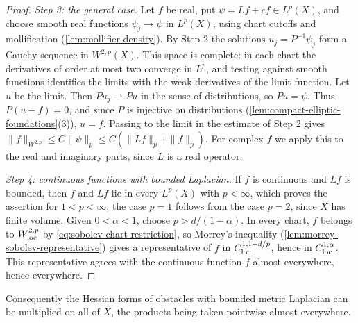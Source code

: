 \begin{proof}
\emph{Step 3: the general case.} Let $f$ be real, put $\psi=Lf+cf\in L^p(X)$, and choose smooth real functions $\psi_j\to\psi$ in $L^p(X)$, using chart cutoffs and mollification (\cref{lem:mollifier-density}). By Step 2 the solutions $u_j=P^{-1}\psi_j$ form a Cauchy sequence in $W^{2,p}(X)$. This space is complete: in each chart the derivatives of order at most two converge in $L^p$, and testing against smooth functions identifies the limits with the weak derivatives of the limit function. Let $u$ be the limit. Then $Pu_j\rightharpoonup Pu$ in the sense of distributions, so $Pu=\psi$. Thus $P(u-f)=0$, and since $P$ is injective on distributions (\cref{lem:compact-elliptic-foundations}(3)), $u=f$. Passing to the limit in the estimate of Step 2 gives $\|f\|_{W^{2,p}}\leq C\|\psi\|_p\leq C(\|Lf\|_p+\|f\|_p)$. For complex $f$ we apply this to the real and imaginary parts, since $L$ is a real operator.

\emph{Step 4: continuous functions with bounded Laplacian.} If $f$ is continuous and $Lf$ is bounded, then $f$ and $Lf$ lie in every $L^p(X)$ with $p<\infty$, which proves the assertion for $1<p<\infty$; the case $p=1$ follows from the case $p=2$, since $X$ has finite volume. Given $0<\alpha<1$, choose $p>d/(1-\alpha)$. In every chart, $f$ belongs to $W^{2,p}_{\mathrm{loc}}$ by \eqref{eq:sobolev-chart-restriction}, so Morrey's inequality (\cref{lem:morrey-sobolev-representative}) gives a representative of $f$ in $C^{1,1-d/p}_{\mathrm{loc}}$, hence in $C^{1,\alpha}_{\mathrm{loc}}$. This representative agrees with the continuous function $f$ almost everywhere, hence everywhere.
\end{proof}

Consequently the Hessian forms of obstacles with bounded metric Laplacian can be multiplied on all of $X$, the products being taken pointwise almost everywhere.

